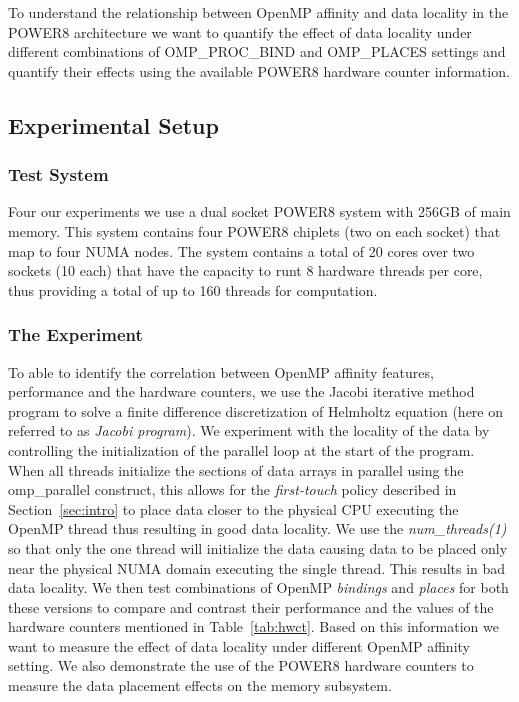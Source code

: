 To understand the relationship between OpenMP affinity and data locality in the POWER8 architecture we want to quantify the effect of data locality under different combinations of OMP\_PROC\_BIND and OMP\_PLACES settings and quantify their effects using the available POWER8 hardware counter information.

\subsection{Experimental Setup}
\subsubsection{Test System}
Four our experiments we use a dual socket POWER8 system with 256GB of main memory. This system contains four POWER8 chiplets (two on each socket) that map to  four NUMA nodes. The system contains a total of 20 cores over two sockets (10 each) that have the capacity to runt 8 hardware threads per core, thus providing a total of up to 160 threads for computation. 

\subsubsection{The Experiment}
To able to identify the correlation between OpenMP affinity features, performance and the hardware counters, we use the Jacobi iterative method program to solve a 
finite difference discretization of Helmholtz equation (here on referred to as \textit{Jacobi program}). We experiment with the locality of the data by controlling the initialization of the parallel loop at the start of the program. 
When all threads initialize the sections of data arrays in parallel using the omp\_parallel construct, this allows for the 
\textit{first-touch} policy described in Section~\ref{sec:intro} to place data closer to the physical CPU executing the OpenMP thread thus resulting in good data locality. 
We use the \textit{num\_threads(1)} so that only the one thread will initialize the data causing data to be placed only near the physical NUMA domain executing the single thread. This results in bad data locality.
We then test combinations of OpenMP \textit{bindings} and \textit{places} for both these versions to compare and contrast their performance and the values of the hardware counters mentioned in Table~\ref{tab:hwct}. Based on this information we want to measure the effect of data locality under different OpenMP affinity setting. We also demonstrate the use of the POWER8 hardware counters to measure the data placement effects on the memory subsystem.

